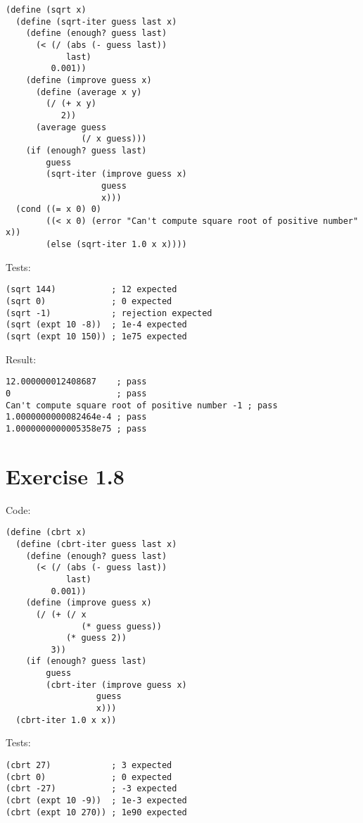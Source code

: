 \documentclass[../main.tex]{subfiles}
\begin{document}
\begin{lstlisting}
(define (sqrt x)
  (define (sqrt-iter guess last x)
    (define (enough? guess last)
      (< (/ (abs (- guess last))
            last)
         0.001))
    (define (improve guess x)
      (define (average x y)
        (/ (+ x y)
           2))
      (average guess
               (/ x guess)))
    (if (enough? guess last)
        guess
        (sqrt-iter (improve guess x)
                   guess
                   x)))
  (cond ((= x 0) 0)
        ((< x 0) (error "Can't compute square root of positive number" x))
        (else (sqrt-iter 1.0 x x))))
\end{lstlisting}

Tests:

\begin{lstlisting}
(sqrt 144)           ; 12 expected
(sqrt 0)             ; 0 expected
(sqrt -1)            ; rejection expected
(sqrt (expt 10 -8))  ; 1e-4 expected
(sqrt (expt 10 150)) ; 1e75 expected
\end{lstlisting}

Result:

\begin{lstlisting}
12.000000012408687    ; pass
0                     ; pass
Can't compute square root of positive number -1 ; pass
1.0000000000082464e-4 ; pass
1.0000000000005358e75 ; pass
\end{lstlisting}

\section{Exercise 1.8}

Code:

\begin{lstlisting}
(define (cbrt x)
  (define (cbrt-iter guess last x)
    (define (enough? guess last)
      (< (/ (abs (- guess last))
            last)
         0.001))
    (define (improve guess x)
      (/ (+ (/ x
               (* guess guess))
            (* guess 2))
         3))
    (if (enough? guess last)
        guess
        (cbrt-iter (improve guess x)
                  guess
                  x)))
  (cbrt-iter 1.0 x x))
\end{lstlisting}

Tests:

\begin{lstlisting}
(cbrt 27)            ; 3 expected
(cbrt 0)             ; 0 expected
(cbrt -27)           ; -3 expected
(cbrt (expt 10 -9))  ; 1e-3 expected
(cbrt (expt 10 270)) ; 1e90 expected
\end{lstlisting}
\end{document}

